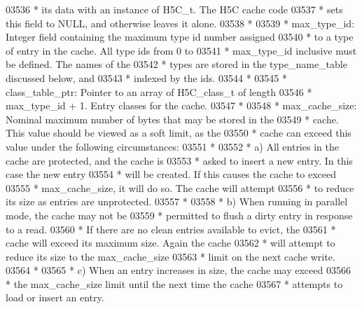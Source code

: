 \begin{DoxyCode}
03536 \textcolor{comment}{ *      its data with an instance of H5C\_t.  The H5C cache code}
03537 \textcolor{comment}{ *      sets this field to NULL, and otherwise leaves it alone.}
03538 \textcolor{comment}{ *}
03539 \textcolor{comment}{ * max\_type\_id: Integer field containing the maximum type id number assigned}
03540 \textcolor{comment}{ *      to a type of entry in the cache.  All type ids from 0 to}
03541 \textcolor{comment}{ *      max\_type\_id inclusive must be defined.  The names of the}
03542 \textcolor{comment}{ *      types are stored in the type\_name\_table discussed below, and}
03543 \textcolor{comment}{ *      indexed by the ids.}
03544 \textcolor{comment}{ *}
03545 \textcolor{comment}{ * class\_table\_ptr: Pointer to an array of H5C\_class\_t of length}
03546 \textcolor{comment}{ *              max\_type\_id + 1.  Entry classes for the cache.}
03547 \textcolor{comment}{ *}
03548 \textcolor{comment}{ * max\_cache\_size:  Nominal maximum number of bytes that may be stored in the}
03549 \textcolor{comment}{ *              cache.  This value should be viewed as a soft limit, as the}
03550 \textcolor{comment}{ *              cache can exceed this value under the following circumstances:}
03551 \textcolor{comment}{ *}
03552 \textcolor{comment}{ *              a) All entries in the cache are protected, and the cache is}
03553 \textcolor{comment}{ *                 asked to insert a new entry.  In this case the new entry}
03554 \textcolor{comment}{ *                 will be created.  If this causes the cache to exceed}
03555 \textcolor{comment}{ *                 max\_cache\_size, it will do so.  The cache will attempt}
03556 \textcolor{comment}{ *                 to reduce its size as entries are unprotected.}
03557 \textcolor{comment}{ *}
03558 \textcolor{comment}{ *              b) When running in parallel mode, the cache may not be}
03559 \textcolor{comment}{ *         permitted to flush a dirty entry in response to a read.}
03560 \textcolor{comment}{ *         If there are no clean entries available to evict, the}
03561 \textcolor{comment}{ *         cache will exceed its maximum size.  Again the cache}
03562 \textcolor{comment}{ *                 will attempt to reduce its size to the max\_cache\_size}
03563 \textcolor{comment}{ *                 limit on the next cache write.}
03564 \textcolor{comment}{ *}
03565 \textcolor{comment}{ *      c) When an entry increases in size, the cache may exceed}
03566 \textcolor{comment}{ *         the max\_cache\_size limit until the next time the cache}
03567 \textcolor{comment}{ *         attempts to load or insert an entry.}

\end{DoxyCode}

